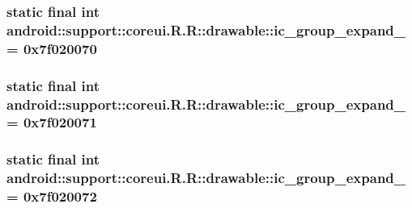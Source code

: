 \hypertarget{classandroid_1_1support_1_1coreui_1_1_r_1_1drawable_8e92cb2c75b35a001216eb60ef8e46d3}{
\subsubsection[{ic\_\-group\_\-expand\_\-01}]{\setlength{\rightskip}{0pt plus 5cm}static final int android::support::coreui.R.R::drawable::ic\_\-group\_\-expand\_ = 0x7f020070}}
\label{classandroid_1_1support_1_1coreui_1_1_r_1_1drawable_8e92cb2c75b35a001216eb60ef8e46d3}


\hypertarget{classandroid_1_1support_1_1coreui_1_1_r_1_1drawable_a04667af8ceffe9409f984a418de3e8a}{
\subsubsection[{ic\_\-group\_\-expand\_\-02}]{\setlength{\rightskip}{0pt plus 5cm}static final int android::support::coreui.R.R::drawable::ic\_\-group\_\-expand\_ = 0x7f020071}}
\label{classandroid_1_1support_1_1coreui_1_1_r_1_1drawable_a04667af8ceffe9409f984a418de3e8a}


\hypertarget{classandroid_1_1support_1_1coreui_1_1_r_1_1drawable_0c20e39aced1e8fdc7c3f38ee72696ba}{
\subsubsection[{ic\_\-group\_\-expand\_\-03}]{\setlength{\rightskip}{0pt plus 5cm}static final int android::support::coreui.R.R::drawable::ic\_\-group\_\-expand\_ = 0x7f020072}}
\label{classandroid_1_1support_1_1coreui_1_1_r_1_1drawable_0c20e39aced1e8fdc7c3f38ee72696ba}



